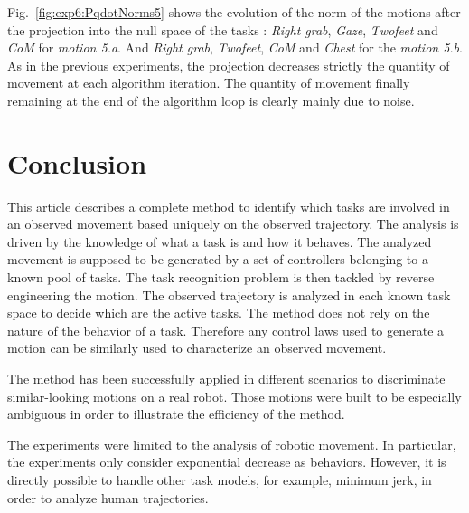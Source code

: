 \documentclass[journal]{IEEEtran}
\begin{document}
Fig.~\ref{fig:exp6:PqdotNorms5} shows the evolution of the norm of the motions after the projection
into the null space of the tasks : \emph{Right grab},  \emph{Gaze}, \emph{Twofeet} and \emph{CoM} for
\emph{motion 5.a}. And \emph{Right grab}, \emph{Twofeet}, \emph{CoM} and \emph{Chest} for the
\emph{motion 5.b}.
As in the previous experiments, the projection decreases strictly the quantity of movement
at each algorithm iteration. The quantity of movement finally remaining at the end of
the algorithm loop is clearly mainly due to noise.

\section{Conclusion}
This article describes a complete method to identify which tasks are involved in an observed movement
based uniquely on the observed trajectory.
The analysis is driven by the knowledge
of what a task is and how it behaves.
The analyzed movement is supposed to be generated by a set of
controllers belonging to a known pool of tasks.
The task recognition problem is then tackled by reverse engineering the motion.
The observed trajectory is analyzed
in each known task space to decide which are the active tasks.
The method does not rely on the nature of the behavior of a task. Therefore
any control laws used to generate a motion can be similarly
used to characterize an observed movement.

The method has been successfully applied in different
scenarios to discriminate similar-looking motions on a real robot. Those motions were built to be especially
ambiguous in order to illustrate the efficiency of the method.

The experiments were limited to the analysis of robotic movement. In particular,
the experiments only consider exponential decrease as behaviors.
However, it is directly possible to handle other task models, for example, minimum jerk,
in order to analyze human trajectories.


\end{document}
